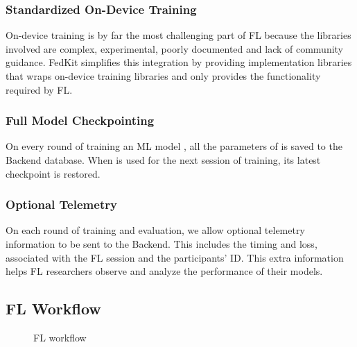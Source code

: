 \documentclass[letterpaper]{article} %
\begin{document}
\subsubsection{Standardized On-Device Training}
On-device training is by far the most challenging part of FL because
the libraries involved are complex, experimental, poorly documented
and lack of community guidance.
FedKit simplifies this integration by providing implementation libraries
that wraps on-device training libraries and
only provides the functionality required by FL.

\subsubsection{Full Model Checkpointing}
On every round of training an ML model \model,
all the parameters of \model{} is saved to the Backend database.
When \model{} is used for the next session of training,
its latest checkpoint is restored.

\subsubsection{Optional Telemetry}
On each round of training and evaluation,
we allow optional telemetry information to be sent to the Backend.
This includes the timing and loss,
associated with the FL session and the participants' ID.
This extra information helps FL researchers observe and analyze
the performance of their models.

\subsection{FL Workflow}

\begin{figure}
\centering
{}
\caption{FL workflow}
\label{fig:fl-workflow}
\end{figure}
\end{document}
